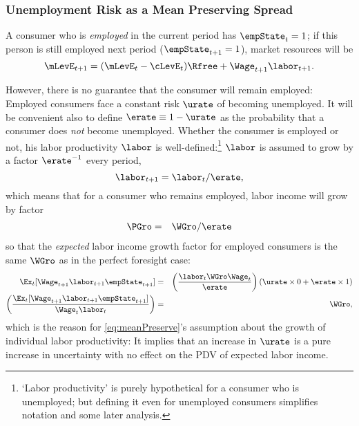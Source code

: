 \subsubsection{Unemployment Risk as a Mean Preserving Spread} \label{subsubsec:uMPS}
A consumer who is {\it employed} in the current
period has $\empState_{t}=1$; if this person is still employed next
period ($\empState_{t+1}=1$), market resources will be
\begin{equation}
\mLevE_{t+1} = (\mLevE_{t}-\cLevE_{t})\Rfree+\Wage_{t+1}\labor_{t+1}. \label{eq:Metp1}
\end{equation}

However, there is no guarantee that the consumer will remain employed: Employed consumers face a constant risk $\urate$ of becoming unemployed.  %
It will be convenient also to define $\erate\equiv 1-\urate$ as the probability that a consumer does {\it not} become unemployed.  Whether the consumer is employed or not, his labor productivity $\labor$ is well-defined:\footnote{`Labor productivity' is purely hypothetical for a consumer who is unemployed; but defining it even for unemployed consumers simplifies notation and some later analysis.}  $\labor$ is assumed to grow by a factor $\erate^{-1}$ every period,
\begin{equation}
\labor_{t+1} =    \labor_{t}/\erate \label{eq:meanPreserve},
\end{equation}
which means that for a consumer who remains employed, labor income will grow by factor
\begin{equation}\begin{gathered}\begin{aligned}
  \PGro & = & \WGro/\erate
\end{aligned}\end{gathered}\end{equation}
so that the {\it expected} labor income growth factor for
employed consumers is the same $\WGro$ as in the perfect foresight case:
\begin{equation*}\begin{gathered}\begin{aligned}
  \Ex_{t}[\Wage_{t+1}\labor_{t+1}\empState_{t+1}] & = &  \left(\frac{\labor_{t} \WGro \Wage_{t}}{\erate}\right)\left(\urate \times 0 + \erate \times 1 \right)
\\ \left(\frac{\Ex_{t}[\Wage_{t+1}\labor_{t+1}\empState_{t+1}]}{\Wage_{t} \labor_{t}}\right) &  = & \WGro
,
\end{aligned}\end{gathered}\end{equation*}
which is  the reason for \eqref{eq:meanPreserve}'s assumption about the growth of
individual labor productivity: It implies
that an increase in $\urate$ is a pure increase in uncertainty with no
effect on the PDV of expected labor income.

